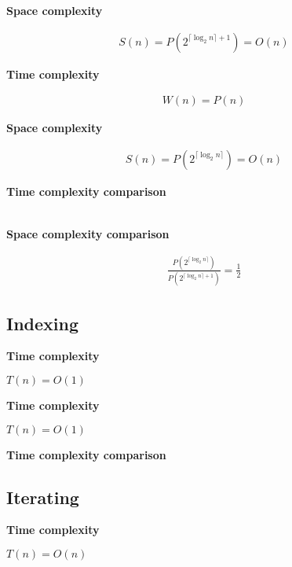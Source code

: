 \documentclass{article}
\newcommand{\tcomplex}{\textbf{Time complexity}}
\newcommand{\scomplex}{\textbf{Space complexity}}
\newcommand{\tcomplexcmp}{\textbf{Time complexity comparison}}
\newcommand{\scomplexcmp}{\textbf{Space complexity comparison}}
\newcommand{\timefn}{T}
\newcommand{\spacefn}{S}
\newcommand{\nwritesfn}{W}
\newcommand{\bigo}{O}
\newcommand{\biggo}{P}
\newcommand{\varnitems}{n}
\begin{document}
	\scomplex
	
	\begin{align*}
	\spacefn(\varnitems) = \biggo(2^{\lceil \log_2 \varnitems \rceil + 1}) = \bigo(\varnitems)
	\end{align*}
	
	
	\tcomplex
	
	\begin{align*}
	\nwritesfn(\varnitems) = \biggo(\varnitems)
	\end{align*}
	
	\scomplex
	
	\begin{align*}
	\spacefn(\varnitems) = \biggo(2^{\lceil \log_2 \varnitems \rceil}) = \bigo(\varnitems)
	\end{align*}
	
	\tcomplexcmp
	
	\begin{align*}
	\end{align*}
	
	\scomplexcmp
	
	\begin{align*}
	\frac {\biggo(2^{\lceil \log_2 \varnitems \rceil})} {\biggo(2^{\lceil \log_2 \varnitems \rceil + 1})} = \frac{1}{2}
	\end{align*}
	
	\subsection{Indexing}
	
	
	\tcomplex
	
	$\timefn(\varnitems) = \bigo(1)$
	
	
	\tcomplex
	
	$\timefn(\varnitems) = \bigo(1)$
	
	\tcomplexcmp
	
	\subsection{Iterating}
	
	
	\tcomplex
	
	$\timefn(\varnitems) = \bigo(\varnitems)$
	
	
\end{document}
